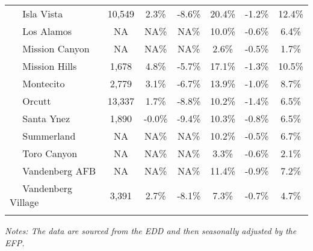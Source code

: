 \documentclass[12pt]{article}
\begin{document}
\begin{landscape}
\begin{table}
\begin{tabular}{|l|c|c|c||c|c|c|}
$\quad$ Isla Vista & 10,549 & 2.3\% & -8.6\% & 20.4\% & -1.2\% & 12.4\% \\
$\quad$ Los Alamos & NA & NA\% & NA\% & 10.0\% & -0.6\% & 6.4\% \\
$\quad$ Mission Canyon & NA & NA\% & NA\% & 2.6\% & -0.5\% & 1.7\% \\
$\quad$ Mission Hills & 1,678 & 4.8\% & -5.7\% & 17.1\% & -1.3\% & 10.5\% \\
$\quad$ Montecito & 2,779 & 3.1\% & -6.7\% & 13.9\% & -1.0\% & 8.7\% \\
$\quad$ Orcutt & 13,337 & 1.7\% & -8.8\% & 10.2\% & -1.4\% & 6.5\% \\
$\quad$ Santa Ynez & 1,890 & -0.0\% & -9.4\% & 10.3\% & -0.8\% & 6.5\% \\
$\quad$ Summerland & NA & NA\% & NA\% & 10.2\% & -0.5\% & 6.7\% \\
$\quad$ Toro Canyon & NA & NA\% & NA\% & 3.3\% & -0.6\% & 2.1\% \\
$\quad$ Vandenberg AFB & NA & NA\% & NA\% & 11.4\% & -0.9\% & 7.2\% \\
$\quad$ Vandenberg Village & 3,391 & 2.7\% & -8.1\% & 7.3\% & -0.7\% & 4.7\% \\
&&&&&& \\ \hline \hline
\end{tabular}
\par
\vspace{.5em}
\footnotesize
\textit{Notes: The data are sourced from the EDD and then seasonally adjusted by the EFP.}
\end{table}
\end{landscape}
\end{document}
